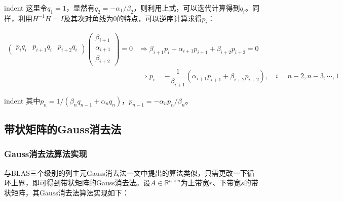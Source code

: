 \documentclass[UTF8,nofonts]{ctexart}
\begin{document}
indent 这里令$q_1=1$，显然有$q_2=-\alpha_1/\beta_2$，则利用上式，可以迭代计算得到$q_i$。同样，利用$H^{-1}H=I$及其次对角线为$0$的特点，可以逆序计算求得$p_i$：

\begin{align*}
\begin{pmatrix}p_iq_i & p_{i+1}q_i & p_{i+2}q_i \end{pmatrix}
\begin{pmatrix}\beta_{i+1} \\ \alpha_{i+1} \\ \beta_{i+2}\end{pmatrix}=0
&\Longrightarrow \beta_{i+1}p_i+\alpha_{i+1}p_{i+1}+\beta_{i+2}p_{i+2}=0 \\
&\Longrightarrow p_{i}=-\dfrac{1}{\beta_{i+1}}(\alpha_{i+1}p_{i+1}+\beta_{i+2}p_{i+2}),\quad i=n-2,n-3,\cdots,1
\end{align*}

indent 其中$p_n=1/(\beta_nq_{n-1}+\alpha_nq_n)$，$p_{n-1}=-\alpha_np_n/\beta_n$。


\subsection*{带状矩阵的Gauss消去法}

\subsubsection*{Gauss消去法算法实现}

与BLAS三个级别的列主元Gauss消去法一文中提出的算法类似，只需更改一下循环上界，即可得到带状矩阵的Gauss消去法。设$A\in\mathbb{R}^{n \times n}$为上带宽$r$、下带宽$s$的带状矩阵，其Gauss消去法算法实现如下：

\begin{algorithm}[H]
\end{algorithm}
\end{document}

